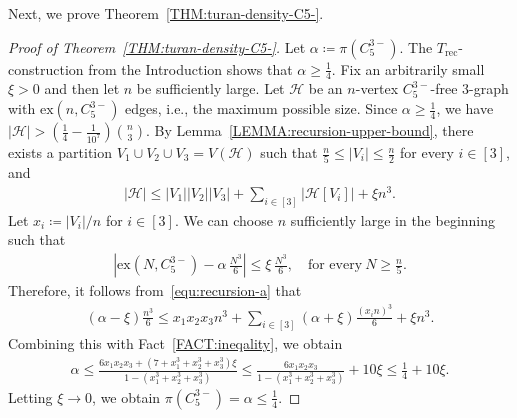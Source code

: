 \documentclass[11pt,a4paper]{article}
\theoremstyle{remark}
\begin{document}
Next, we prove Theorem~\ref{THM:turan-density-C5-}. 
%
\begin{proof}[Proof of Theorem~\ref{THM:turan-density-C5-}]  Let $\alpha \coloneqq \pi(C_{5}^{3-})$. The $T_{\mathrm{rec}}$-construction from the Introduction shows that $\alpha\ge \frac14$.
    Fix an arbitrarily small $\xi > 0$ and then let $n$ be sufficiently large. 
    Let $\mathcal{H}$ be an $n$-vertex $C_{5}^{3-}$-free $3$-graph with $\mathrm{ex}(n,C_{5}^{3-})$ edges, i.e., the maximum possible size. Since $\alpha \ge \frac{1}{4}$, we have  $|\mathcal{H}| > \left(\frac{1}{4} - \frac{1}{10^7}\right)\binom{n}{3}$. 
    By Lemma~\ref{LEMMA:recursion-upper-bound}, there exists a partition $V_1 \cup V_2 \cup V_3 = V(\mathcal{H})$ such that $\frac{n}{5} \le |V_i| \le \frac{n}{2}$ for every $i \in [3]$, and 
    \begin{align}\label{equ:recursion-a}
        |\mathcal{H}|
        \le |V_1||V_2||V_3| + \sum_{i\in [3]}|\mathcal{H}[V_i]| + \xi n^3.
    \end{align}
    Let $x_i \coloneqq |V_i|/n$ for $i \in [3]$. 
    We can choose $n$ sufficiently large in the beginning such that  
    \begin{align}\label{equ:turan-number-concentrate}
       \left|\mathrm{ex}(N,C_{5}^{3-}) - \alpha \, \frac{N^3}{6} \right| 
        \le \xi\,\frac{N^3}6,
        \quad\text{for every}~N \ge \frac{n}{5}. 
    \end{align}
    Therefore, it follows from~\eqref{equ:recursion-a} that 
    \begin{align*}
        (\alpha - \xi) \frac{n^3}{6}
        \le x_1x_2x_3 n^3 
            + \sum_{i\in [3]} (\alpha + \xi) \frac{(x_in)^3}{6}
            + \xi n^3.
    \end{align*}
    Combining this with Fact~\ref{FACT:ineqality}, we obtain 
    \begin{align*}
        \alpha 
        \le \frac{6x_1x_2x_3 + (7+x_1^3+x_2^3+x_3^3)\xi}{1-(x_1^3+x_2^3+x_3^3)}
        \le \frac{6x_1x_2x_3}{1-(x_1^3+x_2^3+x_3^3)} + 10 \xi 
        \le \frac{1}{4}+ 10 \xi. 
    \end{align*}
%
Letting $\xi \to 0$, we obtain $\pi(C_{5}^{3-}) = \alpha \le \frac{1}{4}$.
\end{proof}

\end{document}
